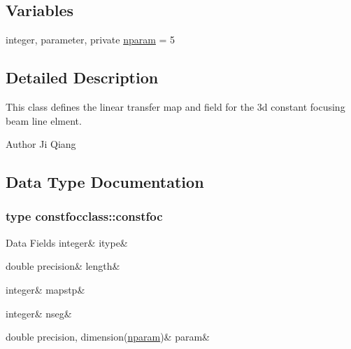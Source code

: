 \subsection*{Variables}
\begin{DoxyCompactItemize}
\item 
integer, parameter, private \mbox{\hyperlink{namespaceconstfocclass_a4a04b85ebc26340b40e7c38cfad62bc1}{nparam}} = 5
\end{DoxyCompactItemize}


\subsection{Detailed Description}
This class defines the linear transfer map and field for the 3d constant focusing beam line elment. 

\begin{DoxyAuthor}{Author}
Ji Qiang 
\end{DoxyAuthor}


\subsection{Data Type Documentation}
\label{structconstfocclass_1_1constfoc}
\subsubsection{type constfocclass\+::constfoc}
\begin{DoxyFields}{Data Fields}
\mbox{\label{namespaceconstfocclass_a6805e237c322783df518e8f2c3e1feec}} 
integer&
itype&
\\
\hline

\mbox{\label{namespaceconstfocclass_a20a95ee3a0c6fd8f128d4fbe911077db}} 
double precision&
length&
\\
\hline

\mbox{\label{namespaceconstfocclass_a7211bb49a75643cd5898f13851eb852e}} 
integer&
mapstp&
\\
\hline

\mbox{\label{namespaceconstfocclass_ad5d129a88d9e84629813d001b6379bf5}} 
integer&
nseg&
\\
\hline

\mbox{\label{namespaceconstfocclass_a91cddf45b9010e35e24ae6cd063a9ee7}} 
double precision, dimension(\mbox{\hyperlink{namespaceconstfocclass_a4a04b85ebc26340b40e7c38cfad62bc1}{nparam}})&
param&
\\
\hline

\end{DoxyFields}


